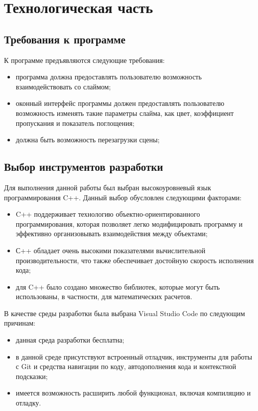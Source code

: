 \chapter{Технологическая часть}

\section{Требования к программе}

К программе предъявляются следующие требования:

\begin{itemize}
	\item программа должна предоставлять пользователю возможность взаимодействовать со слаймом;
	\item оконный интерфейс программы должен предоставлять пользователю возможность изменять такие параметры слайма, как цвет, коэффициент пропускания и показатель поглощения;
	\item должна быть возможность перезагрузки сцены;
\end{itemize}

\section{Выбор инструментов разработки}

Для выполнения данной работы был выбран высокоуровневый язык
программирования C++. Данный выбор обусловлен следующими факторами:

\begin{itemize}
	\item C++ поддерживает технологию объектно-ориентированного
	программирования, которая позволяет легко модифицировать программу и
	эффективно организовывать взаимодействия между объектами;
	\item С++ обладает очень высокими показателями вычислительной
	производительности, что также обеспечивает достойную скорость исполнения
	кода;
	\item для C++ было создано множество библиотек, которые могут быть
	использованы, в частности, для математических расчетов.
\end{itemize}

В качестве среды разработки была выбрана Visual Studio Code по
следующим причинам:

\begin{itemize}
	\item данная среда разработки бесплатна;
	\item в данной среде присутствуют встроенный отладчик, инструменты для
	работы с Git и средства навигации по коду, автодополнения кода и контекстной
	подсказки;
	\item имеется возможность расширить любой функционал, включая
	компиляцию и отладку.
\end{itemize}

